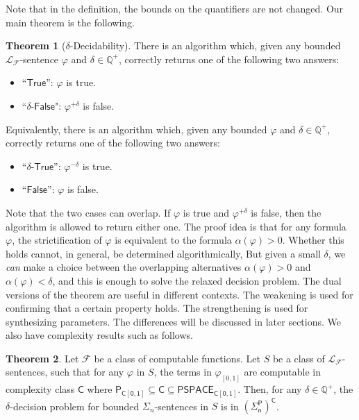 \documentclass[11pt]{article}
\theoremstyle{definition}
\newtheorem{theorem}{Theorem}[section]
\begin{document}
Note that in the definition, the bounds on the quantifiers are not changed. Our main theorem is the following. 
\begin{theorem}[$\delta$-Decidability]\label{main}
There is an algorithm which, given any bounded $\mathcal{L}_{\mathcal{F}}$-sentence $\varphi$ and $\delta\in \mathbb{Q}^+$, correctly returns one of the following two answers:
\begin{itemize}
\item ``$\mathsf{True}$'': $\varphi$ is true. 
\item ``$\delta$-$\mathsf{False}$": $\varphi^{+\delta}$ is false. 
\end{itemize}
Equivalently, there is an algorithm which, given any bounded $\varphi$ and $\delta\in \mathbb{Q}^+$, correctly returns one of the following two answers:
\begin{itemize}
\item ``$\delta$-$\mathsf{True}$'': $\varphi^{-\delta}$ is true. 
\item ``$\mathsf{False}$'': $\varphi$ is false. 
\end{itemize}
\end{theorem}
Note that the two cases can overlap. If $\varphi$ is true and $\varphi^{+\delta}$ is false, then the algorithm is allowed to return either one. The proof idea is that for any formula $\varphi$, the strictification of $\varphi$ is equivalent to the formula $\alpha(\varphi) > 0$. Whether this holds cannot, in general, be determined algorithmically, But given a small $\delta$, we {\em can} make a choice between the overlapping alternatives $\alpha(\varphi) > 0$ and $\alpha(\varphi) < \delta$, and this is enough to solve the relaxed decision problem. The dual versions of the theorem are useful in different contexts. The weakening is used for confirming that a certain property holds. The strengthening is used for synthesizing parameters. The differences will be discussed in later sections. We also have complexity results such as follows.
\begin{theorem}\label{compmain}
Let $\mathcal{F}$ be a class of computable functions. Let $S$ be a class of $\mathcal{L}_{\mathcal{F}}$-sentences, such that for any $\varphi$ in $S$, the terms in $\varphi_{[0,1]}$ are computable in complexity class $\mathsf{C}$ where $\mathsf{P_{C[0,1]}\subseteq \mathsf{C}\subseteq \mathsf{PSPACE_{C[0,1]}}}$. Then, for any $\delta\in \mathbb{Q}^+$, the $\delta$-decision problem for bounded $\Sigma_n$-sentences in $S$ is in $\mathsf{(\Sigma_n^P)^C}$.
\end{theorem}
\end{document}
